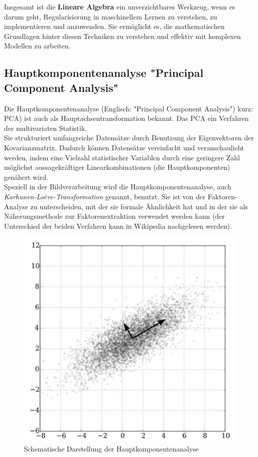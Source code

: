 \documentclass[12pt]{article}
\begin{document}
Insgesamt ist die \textbf{Lineare Algebra} ein unverzichtbares Werkzeug, wenn es darum geht, Regularisierung in maschinellem Lernen zu verstehen, zu implementieren und anzuwenden. Sie ermöglicht es, die mathematischen Grundlagen hinter diesen Techniken zu verstehen und effektiv mit komplexen Modellen zu arbeiten. \\

\newpage

\subsection{Hauptkomponentenanalyse "Principal Component Analysis"}
 
Die Hauptkomponentenanalyse (Englisch: "Principal Component Analysis") kurz: PCA) ist auch als Hauptachsentransformation bekannt. Das PCA  ein Verfahren der multivariaten Statistik.\\
Sie strukturiert umfangreiche Datensätze durch Benutzung der Eigenvektoren der Kovarianzmatrix. Dadurch können Datensätze vereinfacht und veranschaulicht werden, indem eine Vielzahl statistischer Variablen durch eine geringere Zahl möglichst aussagekräftiger Linearkombinationen (die Hauptkomponenten) genähert wird.\\
Speziell in der Bildverarbeitung wird die Hauptkomponentenanalyse, auch \textit{Karhunen-Loève-Transformation} genannt, benutzt. Sie ist von der Faktoren-Analyse zu unterscheiden, mit der sie formale Ähnlichkeit hat und in der sie als Näherungsmethode zur Faktorenextraktion verwendet werden kann (der Unterschied der beiden Verfahren kann in Wikipedia nachgelesen werden). \\[0.2cm]
\begin{figure}[h]
  \centering
  \includegraphics[width=0.6
  \textwidth]{Hauptkomponentenanalyse}
  \caption{Schematische Darstellung der Hauptkomponentenanalyse}
  \label{fig:HK_A}
\end{figure}
\end{document}
